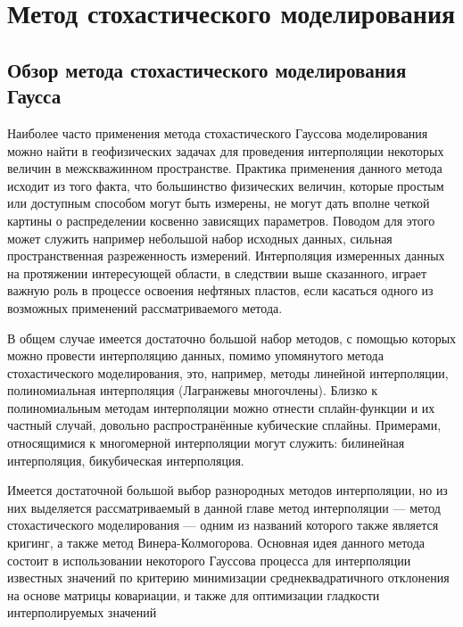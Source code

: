 \chapter{Метод стохастического моделирования} \label{chapt1}

\section{Обзор метода стохастического моделирования Гаусса} \label{sect1_1}
Наиболее часто применения метода стохастического Гауссова моделирования можно найти в геофизических задачах для проведения интерполяции некоторых величин в межскважинном пространстве\cite[с.~33]{chung2019supplement}. Практика применения данного метода исходит из того факта, что большинство физических величин, которые простым или доступным способом могут быть измерены, не могут дать вполне четкой картины о распределении косвенно зависящих параметров. Поводом для этого может служить например небольшой набор исходных данных, сильная пространственная разреженность измерений. Интерполяция измеренных данных на протяжении интересующей области, в следствии выше сказанного, играет важную роль в процессе освоения нефтяных пластов, если касаться одного из возможных применений рассматриваемого метода. 

В общем случае имеется достаточно большой набор методов, с помощью которых можно провести интерполяцию данных, помимо упомянутого метода стохастического моделирования, это, например, методы линейной интерполяции, полиномиальная интерполяция (Лагранжевы многочлены). Близко к полиномиальным методам интерполяции можно отнести сплайн-функции и их частный случай, довольно распространённые кубические сплайны. Примерами, относящимися к многомерной интерполяции могут служить: билинейная интерполяция, бикубическая интерполяция.

Имеется достаточной большой выбор разнородных методов интерполяции, но из них выделяется рассматриваемый в данной главе метод интерполяции — метод стохастического моделирования — одним из названий которого также является кригинг, а также метод Винера-Колмогорова. Основная идея данного метода состоит в использовании некоторого Гауссова процесса для интерполяции известных значений по критерию минимизации среднеквадратичного отклонения на основе матрицы ковариации, и также для оптимизации гладкости интерполируемых значений

